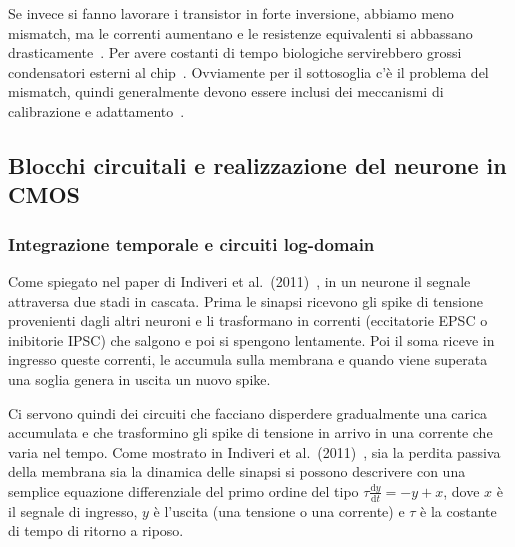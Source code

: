 Se invece si fanno lavorare i transistor in forte inversione, abbiamo meno mismatch, ma le correnti aumentano e le resistenze equivalenti si abbassano drasticamente~\cite{indiveri2011}. Per avere costanti di tempo biologiche servirebbero grossi condensatori esterni al chip~\cite{indiveri2011}. Ovviamente per il sottosoglia c'è il problema del mismatch, quindi generalmente devono essere inclusi dei meccanismi di calibrazione e adattamento~\cite{indiveri2011, qiao2015}.

\subsection{Blocchi circuitali e realizzazione del neurone in CMOS}
\label{subsec:blocchi_fondamentali}

\subsubsection{Integrazione temporale e circuiti log-domain}
Come spiegato nel paper di Indiveri et al.\ (2011)~\cite{indiveri2011}, in un neurone il segnale attraversa due stadi in cascata. Prima le sinapsi ricevono gli spike di tensione provenienti dagli altri neuroni e li trasformano in correnti (eccitatorie EPSC o inibitorie IPSC) che salgono e poi si spengono lentamente. Poi il soma riceve in ingresso queste correnti, le accumula sulla membrana e quando viene superata una soglia genera in uscita un nuovo spike. 

Ci servono quindi dei circuiti che facciano disperdere gradualmente una carica accumulata e che trasformino gli spike di tensione in arrivo in una corrente che varia nel tempo. Come mostrato in Indiveri et al.\ (2011)~\cite{indiveri2011}, sia la perdita passiva della membrana sia la dinamica delle sinapsi si possono descrivere con una semplice equazione differenziale del primo ordine del tipo $\tau \frac{\mathrm{d}y}{\mathrm{d}t} = -y + x$, dove $x$ è il segnale di ingresso, $y$ è l'uscita (una tensione o una corrente) e $\tau$ è la costante di tempo di ritorno a riposo.

